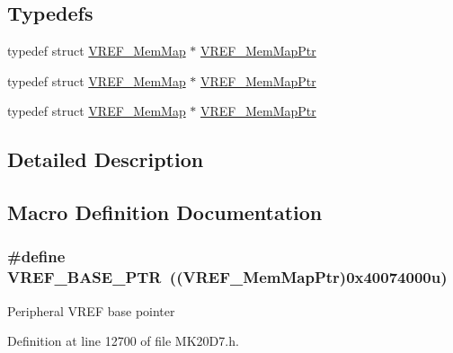 \subsection*{Typedefs}
\begin{DoxyCompactItemize}
\item 
typedef struct \hyperlink{struct_v_r_e_f___mem_map}{V\+R\+E\+F\+\_\+\+Mem\+Map} $\ast$ \hyperlink{group___v_r_e_f___peripheral_ga0730b01086e1d40975ad4e6c1d101b7c}{V\+R\+E\+F\+\_\+\+Mem\+Map\+Ptr}
\item 
typedef struct \hyperlink{struct_v_r_e_f___mem_map}{V\+R\+E\+F\+\_\+\+Mem\+Map} $\ast$ \hyperlink{group___v_r_e_f___peripheral_ga0730b01086e1d40975ad4e6c1d101b7c}{V\+R\+E\+F\+\_\+\+Mem\+Map\+Ptr}
\item 
typedef struct \hyperlink{struct_v_r_e_f___mem_map}{V\+R\+E\+F\+\_\+\+Mem\+Map} $\ast$ \hyperlink{group___v_r_e_f___peripheral_ga0730b01086e1d40975ad4e6c1d101b7c}{V\+R\+E\+F\+\_\+\+Mem\+Map\+Ptr}
\end{DoxyCompactItemize}


\subsection{Detailed Description}


\subsection{Macro Definition Documentation}
\subsubsection[{\texorpdfstring{V\+R\+E\+F\+\_\+\+B\+A\+S\+E\+\_\+\+P\+TR}{VREF_BASE_PTR}}]{\setlength{\rightskip}{0pt plus 5cm}\#define V\+R\+E\+F\+\_\+\+B\+A\+S\+E\+\_\+\+P\+TR~(({\bf V\+R\+E\+F\+\_\+\+Mem\+Map\+Ptr})0x40074000u)}\hypertarget{group___v_r_e_f___peripheral_ga53dba79dbefcdd6f788740a6d0caa57d}{}\label{group___v_r_e_f___peripheral_ga53dba79dbefcdd6f788740a6d0caa57d}
Peripheral V\+R\+EF base pointer 

Definition at line 12700 of file M\+K20\+D7.\+h.

